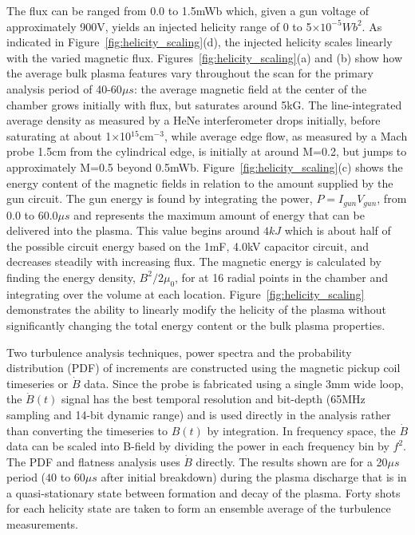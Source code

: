 \documentclass[aps,prl,amsmath,amssymb,reprint,superscriptaddress]{revtex4-1} %
\begin{document}
The flux can be ranged from 0.0 to 1.5mWb which, given a gun voltage of approximately 900V, yields an injected helicity range of 0 to 5$ \times 10^{-5} Wb^{2}$. As indicated in Figure~\ref{fig:helicity_scaling}(d), the injected helicity scales linearly with the varied magnetic flux. Figures~\ref{fig:helicity_scaling}(a) and (b) show how the average bulk plasma features vary throughout the scan for the primary analysis period of 40-60$\mu s$: the average magnetic field at the center of the chamber grows initially with flux, but saturates around 5kG. The line-integrated average density as measured by a HeNe interferometer drops initially, before saturating at about 1$\times$10$^{15}$cm$^{-3}$, while average edge flow, as measured by a Mach probe 1.5cm from the cylindrical edge, is initially at around M=0.2, but jumps to approximately M=0.5 beyond 0.5mWb. Figure~\ref{fig:helicity_scaling}(c) shows the energy content of the magnetic fields in relation to the amount supplied by the gun circuit. The gun energy is found by integrating the power, $P = I_{gun}V_{gun}$, from 0.0 to 60.0$\mu s$ and represents the maximum amount of energy that can be delivered into the plasma. This value begins around $4kJ$ which is about half of the possible circuit energy based on the 1mF, 4.0kV capacitor circuit, and decreases steadily with increasing flux. The magnetic energy is calculated by finding the energy density, $B^{2}/2\mu_{0}$, for at 16 radial points in the chamber and integrating over the volume at each location. Figure~\ref{fig:helicity_scaling} demonstrates the ability to linearly modify the helicity of the plasma without significantly changing the total energy content or the bulk plasma properties.

Two turbulence analysis techniques, power spectra and the probability distribution (PDF) of increments are constructed using the magnetic pickup coil timeseries or $\dot{B}$ data. Since the probe is fabricated using a single 3mm wide loop, the $\dot{B}(t)$ signal has the best temporal resolution and bit-depth (65MHz sampling and 14-bit dynamic range) and is used directly in the analysis rather than converting the timeseries to $B(t)$ by integration. In frequency space, the $\dot{B}$ data can be scaled into B-field by dividing the power in each frequency bin by $f^{2}$. The PDF and flatness analysis uses $\dot{B}$ directly. The results shown are for a 20$\mu s$ period ($40$ to $60 \mu s$ after initial breakdown) during the plasma discharge that is in a quasi-stationary state between formation and decay of the plasma. Forty shots for each helicity state are taken to form an ensemble average of the turbulence measurements.
\end{document}

